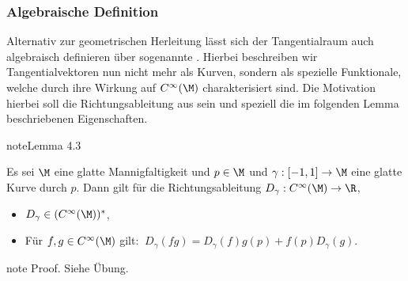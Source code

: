 \documentclass[letterpaper,10pt,english]{jupyterBook}
\begin{document}
\subsubsection{Algebraische Definition}
\label{\detokenize{manifolds/tangential:algebraische-definition}}
\sphinxAtStartPar
Alternativ zur geometrischen Herleitung lässt sich der Tangentialraum auch algebraisch definieren über sogenannte .
Hierbei beschreiben wir Tangentialvektoren nun nicht mehr als Kurven, sondern als spezielle Funktionale, welche durch ihre Wirkung auf \(C^\infty(\M)\) charakterisiert sind.
Die Motivation hierbei soll die Richtungsableitung aus {\hyperref[\detokenize{manifolds/tangential:def:direcdiv}]{}} sein und speziell die im folgenden Lemma beschriebenen Eigenschaften.
\label{manifolds/tangential:lemma-7}
\begin{sphinxadmonition}{note}{Lemma 4.3}



\sphinxAtStartPar
Es sei \(\M\) eine glatte Mannigfaltigkeit und \(p\in\M\) und \(\gamma:[-1,1]\to\M\) eine glatte Kurve durch \(p\).
Dann gilt für die Richtungsableitung \(D_\gamma:C^\infty(\M)\to\R\),
\begin{itemize}
\item {} 
\sphinxAtStartPar
\(D_\gamma\in (C^\infty(\M))^\ast\),

\item {} 
\sphinxAtStartPar
Für \(f,g\in C^\infty(\M)\) gilt: \(\ D_\gamma(fg) = D_\gamma(f) g(p) + f(p) D_\gamma(g)\).

\end{itemize}
\end{sphinxadmonition}

\begin{sphinxadmonition}{note}
\sphinxAtStartPar
Proof. Siehe Übung.
\end{sphinxadmonition}
\end{document}

